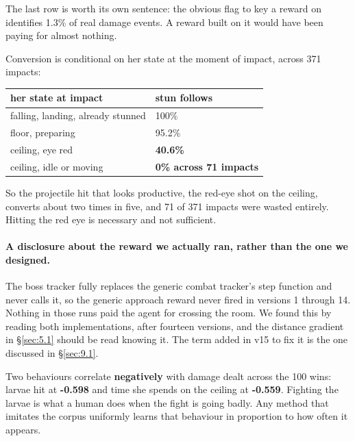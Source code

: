 \documentclass[11pt]{article}
\begin{document}
The last row is worth its own sentence: the obvious flag to key a reward on identifies 1.3\% of real damage events. A reward built on it would have been paying for almost nothing.

Conversion is conditional on her state at the moment of impact, across 371 impacts:

\begin{table}[!htbp]
  \centering
  \label{tab:whetheraprojectilehitconvert}
\begin{center}\small
\begin{tabularx}{\linewidth}{@{}XX@{}}
\toprule
\textbf{her state at impact} & \textbf{stun follows} \\
\midrule
falling, landing, already stunned & 100\% \\
floor, preparing & 95.2\% \\
ceiling, eye red & \textbf{40.6\%} \\
ceiling, idle or moving & \textbf{0\% across 71 impacts} \\
\bottomrule
\end{tabularx}
\end{center}
\end{table}

So the projectile hit that looks productive, the red-eye shot on the ceiling, converts about two times in five, and 71 of 371 impacts were wasted entirely. Hitting the red eye is necessary and not sufficient.

\paragraph{A disclosure about the reward we actually ran, rather than the one we designed.} The boss tracker fully replaces the generic combat tracker's step function and never calls it, so the generic approach reward never fired in versions 1 through 14. Nothing in those runs paid the agent for crossing the room. We found this by reading both implementations, after fourteen versions, and the distance gradient in \S\ref{sec:5.1} should be read knowing it. The term added in v15 to fix it is the one discussed in \S\ref{sec:9.1}.

Two behaviours correlate \textbf{negatively} with damage dealt across the 100 wins: larvae hit at \textbf{-0.598} and time she spends on the ceiling at \textbf{-0.559}. Fighting the larvae is what a human does when the fight is going badly. Any method that imitates the corpus uniformly learns that behaviour in proportion to how often it appears.
\end{document}
